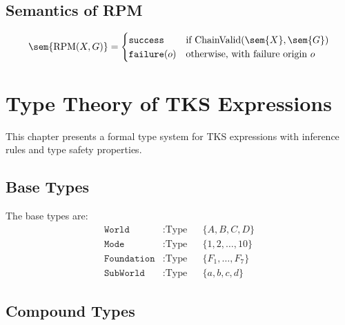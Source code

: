 \section{Semantics of RPM}

\begin{definition}
\label{def:rpm-sem}
\[
\sem{\mathrm{RPM}(X, G)} = \begin{cases}
\mathtt{success} & \text{if } \mathrm{ChainValid}(\sem{X}, \sem{G}) \\
\mathtt{failure}(o) & \text{otherwise, with failure origin } o
\end{cases}
\]
\end{definition}

\chapter{Type Theory of TKS Expressions}
\label{ch:type-theory}

This chapter presents a formal type system for TKS expressions with inference rules and type safety properties.

\section{Base Types}

\begin{definition}
\label{def:base-types}
The base types are:
\begin{align}
\mathtt{World} &: \text{Type} && \{A, B, C, D\} \\
\mathtt{Mode} &: \text{Type} && \{1, 2, \ldots, 10\} \\
\mathtt{Foundation} &: \text{Type} && \{F_1, \ldots, F_7\} \\
\mathtt{SubWorld} &: \text{Type} && \{a, b, c, d\}
\end{align}
\end{definition}

\section{Compound Types}

